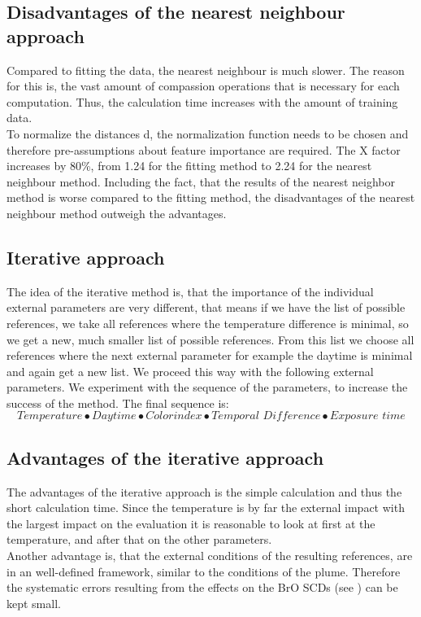 \documentclass  [
  paper    = a4,
  BCOR     = 10mm,
  twoside,
  fontsize = 12pt,
  fleqn,
  toc      = bibnumbered,
  toc      = listofnumbered,
  numbers  = noendperiod,
  headings = normal,
  listof   = leveldown,
  version  = 3.03
]                                       {scrreprt}
\begin{document}
\subsection*{Disadvantages of the nearest neighbour approach}
	Compared to fitting the data, the nearest neighbour is much slower. The reason for this is, the vast amount of compassion operations that is necessary for each computation. Thus, the calculation time increases with the amount of training data.\\
	To normalize the distances d, the normalization function needs to be chosen and therefore pre-assumptions about feature importance are required.
	The X factor increases by 80\%, from 1.24 for the fitting method 
	to 2.24 for the nearest neighbour method.
	Including the fact, that the results of the nearest neighbor method is worse compared to the fitting method, the disadvantages of the nearest neighbour method outweigh the advantages.

	\subsection{Iterative approach}

	The idea of the iterative method is, that the importance of the individual external parameters are very different, that means if we have the list of possible references, we take all references where the temperature difference is minimal, so we get a new, much smaller list of possible references. From this list we choose all references where the next external parameter for example the daytime is minimal and again get a new list. We proceed this way with the following external parameters. We experiment with the sequence of the parameters, to increase the success of the method. The final sequence is:
	\begin{equation*}
	Temperature \bullet  Daytime  \bullet Colorindex \bullet Temporal\,\, Difference \bullet Exposure \,\, time
	\end{equation*} 
	\subsection*{Advantages of the iterative approach}
	The advantages of the iterative approach is the simple calculation and thus the short calculation time. Since the temperature is by far the external impact with the largest impact on the evaluation it is reasonable to look at first at the temperature, and after that on the other parameters. \\
	Another advantage is, that the external conditions of the resulting references, are in an well-defined framework, similar to the  conditions of the plume. Therefore the systematic errors resulting from the effects on the BrO SCDs (see ) can be kept small.
\end{document}

